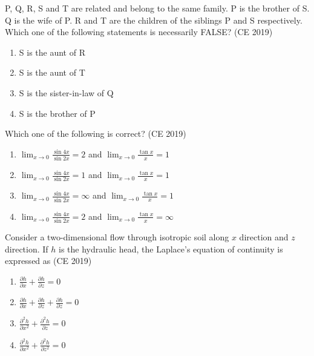 
    \item P, Q, R, S and T are related and belong to the same family. P is the brother of S. Q is the wife of P. R and T are the children of the siblings P and S respectively. Which one of the following statements is necessarily FALSE?  \hfill (CE 2019)
    
    \begin{multicols}{2}
        \begin{enumerate}
            \item S is the aunt of R
            \item S is the aunt of T
            \item S is the sister-in-law of Q
            \item S is the brother of P
        \end{enumerate}
    \end{multicols}
    
    
    \item Which one of the following is correct?  \hfill (CE 2019)
    \begin{multicols}{2}
        \begin{enumerate}
            \item $\lim_{x \to 0} \frac{\sin 4x}{\sin 2x} = 2$ and $\lim_{x \to 0} \frac{\tan x}{x} = 1$
            \item $\lim_{x \to 0} \frac{\sin 4x}{\sin 2x} = 1$ and $\lim_{x \to 0} \frac{\tan x}{x} = 1$
            \item $\lim_{x \to 0} \frac{\sin 4x}{\sin 2x} = \infty$ and $\lim_{x \to 0} \frac{\tan x}{x} = 1$
            \item $\lim_{x \to 0} \frac{\sin 4x}{\sin 2x} = 2$ and $\lim_{x \to 0} \frac{\tan x}{x} = \infty$
        \end{enumerate}
    \end{multicols}

    \item Consider a two-dimensional flow through isotropic soil along $x$ direction and $z$ direction. If $h$ is the hydraulic head, the Laplace's equation of continuity is expressed as  \hfill (CE 2019)
    \begin{multicols}{4}
        \begin{enumerate}
            \item $\frac{\partial h}{\partial x} + \frac{\partial h}{\partial z} = 0$
            \item $\frac{\partial h}{\partial x} + \frac{\partial h}{\partial z} + \frac{\partial h}{\partial z} = 0$
            \item $\frac{\partial^2 h}{\partial x^2} + \frac{\partial^2 h}{\partial z} = 0$
            \item $\frac{\partial^2 h}{\partial x^2} + \frac{\partial^2 h}{\partial z^2} = 0$
        \end{enumerate}
    \end{multicols}


